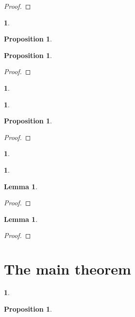 \documentclass{article}
\newtheorem{env}[term]{}
\newtheorem{proposition}[term]{Proposition}
\newtheorem{lemma}[term]{Lemma}
\begin{document}
\begin{proof}
\end{proof}

\begin{env}
\end{env}

\begin{proposition}
\end{proposition}

\begin{proposition}
\end{proposition}

\begin{proof}
\end{proof}

\begin{env}
\end{env}

\begin{env}
\end{env}

\begin{proposition}
\end{proposition}

\begin{proof}
\end{proof}

\begin{env}
\end{env}

\begin{env}
\end{env}

\begin{lemma}
\end{lemma}

\begin{proof}
\end{proof}

\begin{lemma}
\end{lemma}

\begin{proof}
\end{proof}

\section{The main theorem}

\begin{env}
\end{env}

\begin{proposition}
\end{proposition}
\end{document}
